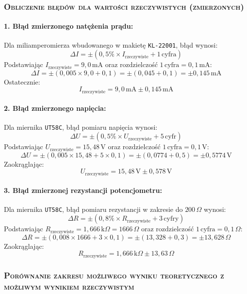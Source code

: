 \documentclass[,a4paper,12pt]{article}
\begin{document}
\subsubsection{\textsc{Obliczenie błędów dla wartości rzeczywistych (zmierzonych)}}

\paragraph{1. Błąd zmierzonego natężenia prądu:}
Dla miliamperomierza wbudowanego w makietę \texttt{KL-22001}, błąd wynosi:
\[
\Delta I = \pm (0,5\% \times I_{\text{rzeczywiste}} + 1 \, \text{cyfra})
\]
Podstawiając \( I_{\text{rzeczywiste}} = 9,0 \, \text{mA} \) oraz rozdzielczość \( 1 \, \text{cyfra} = 0,1 \, \text{mA} \):
\[
\Delta I = \pm (0,005 \times 9,0 + 0,1) = \pm (0,045 + 0,1) = \pm 0,145 \, \text{mA}
\]
Ostatecznie:
\[
I_{\text{rzeczywiste}} = 9,0 \, \text{mA} \pm 0,145 \, \text{mA}
\]

\paragraph{2. Błąd zmierzonego napięcia:}
Dla miernika \texttt{UT58C}, błąd pomiaru napięcia wynosi:
\[
\Delta U = \pm (0,5\% \times U_{\text{rzeczywiste}} + 5 \, \text{cyfr})
\]
Podstawiając \( U_{\text{rzeczywiste}} = 15,48 \, \text{V} \) oraz rozdzielczość \( 1 \, \text{cyfra} = 0,1 \, \text{V} \):
\[
\Delta U = \pm (0,005 \times 15,48 + 5 \times 0,1) = \pm (0,0774 + 0,5) = \pm 0,5774 \, \text{V}
\]
Zaokrąglając:
\[
U_{\text{rzeczywiste}} = 15,48 \, \text{V} \pm 0,578 \, \text{V}
\]

\paragraph{3. Błąd zmierzonej rezystancji potencjometru:}
Dla miernika \texttt{UT58C}, błąd pomiaru rezystancji w zakresie do \( 200 \, \Omega \) wynosi:
\[
\Delta R = \pm (0,8\% \times R_{\text{rzeczywiste}} + 3 \, \text{cyfry})
\]
Podstawiając \( R_{\text{rzeczywiste}} = 1,666 \, \text{k}\Omega = 1666 \, \Omega \) oraz rozdzielczość \( 1 \, \text{cyfra} = 0,1 \, \Omega \):
\[
\Delta R = \pm (0,008 \times 1666 + 3 \times 0,1) = \pm (13,328 + 0,3) = \pm 13,628 \, \Omega
\]
Zaokrąglając:
\[
R_{\text{rzeczywiste}} = 1,666 \, \text{k}\Omega \pm 13,63 \, \Omega
\]
\subsubsection{\textsc{Porównanie zakresu możliwego wyniku teoretycznego z możliwym wynikiem rzeczywistym}}
\end{document}
